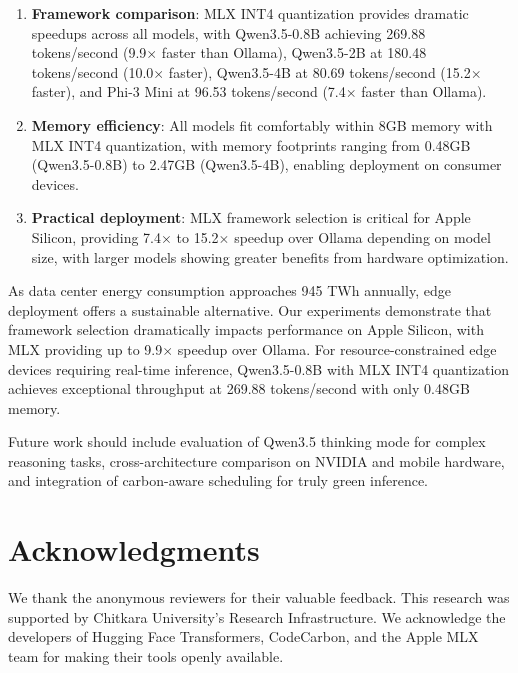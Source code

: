 \documentclass[11pt,a4paper]{article}
\begin{document}
\begin{enumerate}[leftmargin=*,nosep]
    \item \textbf{Framework comparison}: MLX INT4 quantization provides dramatic speedups across all models, with Qwen3.5-0.8B achieving 269.88 tokens/second (9.9$\times$ faster than Ollama), Qwen3.5-2B at 180.48 tokens/second (10.0$\times$ faster), Qwen3.5-4B at 80.69 tokens/second (15.2$\times$ faster), and Phi-3 Mini at 96.53 tokens/second (7.4$\times$ faster than Ollama).
    
    \item \textbf{Memory efficiency}: All models fit comfortably within 8GB memory with MLX INT4 quantization, with memory footprints ranging from 0.48GB (Qwen3.5-0.8B) to 2.47GB (Qwen3.5-4B), enabling deployment on consumer devices.
    
    \item \textbf{Practical deployment}: MLX framework selection is critical for Apple Silicon, providing 7.4$\times$ to 15.2$\times$ speedup over Ollama depending on model size, with larger models showing greater benefits from hardware optimization.
\end{enumerate}
As data center energy consumption approaches 945 TWh annually, edge deployment offers a sustainable alternative. Our experiments demonstrate that framework selection dramatically impacts performance on Apple Silicon, with MLX providing up to 9.9$\times$ speedup over Ollama. For resource-constrained edge devices requiring real-time inference, Qwen3.5-0.8B with MLX INT4 quantization achieves exceptional throughput at 269.88 tokens/second with only 0.48GB memory.

Future work should include evaluation of Qwen3.5 thinking mode for complex reasoning tasks, cross-architecture comparison on NVIDIA and mobile hardware, and integration of carbon-aware scheduling for truly green inference.

\section*{Acknowledgments}

We thank the anonymous reviewers for their valuable feedback. This research was supported by Chitkara University's Research Infrastructure. We acknowledge the developers of Hugging Face Transformers, CodeCarbon, and the Apple MLX team for making their tools openly available.
\end{document}

